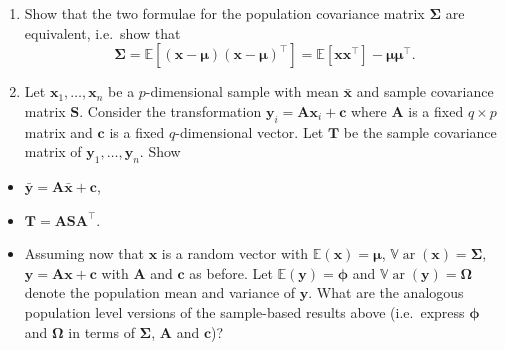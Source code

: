 \documentclass[
]{book}
\theoremstyle{definition}
\theoremstyle{definition}
\theoremstyle{definition}
\theoremstyle{definition}
\theoremstyle{remark}
\begin{document}
\begin{enumerate}
\def\labelenumi{\arabic{enumi}.}
\item
  Show that the two formulae for the population covariance matrix \(\boldsymbol{\Sigma}\) are equivalent, i.e.~show that
  \[\boldsymbol{\Sigma}= {\mathbb{E}}[(\mathbf x- {\boldsymbol{\mu}}) (\mathbf x- {\boldsymbol{\mu}})^\top ] = {\mathbb{E}}[ \mathbf x\mathbf x^\top ] - {\boldsymbol{\mu}}{\boldsymbol{\mu}}^\top.\]
\item
  Let \(\mathbf x_1, \ldots, \mathbf x_n\) be a \(p\)-dimensional sample with mean \(\bar{\mathbf x}\) and sample covariance matrix \(\mathbf S\). Consider the transformation \(\mathbf y_i = \mathbf A\mathbf x_i + \mathbf c\) where \(\mathbf A\) is a fixed \(q \times p\) matrix and \(\mathbf c\) is a fixed \(q\)-dimensional vector. Let \(\mathbf T\) be the sample covariance matrix of \(\mathbf y_1, \ldots, \mathbf y_n\). Show
\end{enumerate}

\begin{itemize}
\item
  \(\bar{\mathbf y} = \mathbf A\bar{\mathbf x} + \mathbf c\),
\item
  \(\mathbf T= \mathbf A\mathbf S\mathbf A^\top\).
\item
  Assuming now that \(\mathbf x\) is a random vector with \({\mathbb{E}}(\mathbf x)={\boldsymbol{\mu}}\), \({\mathbb{V}\operatorname{ar}}(\mathbf x)=\boldsymbol{\Sigma}\), \(\mathbf y=\mathbf A\mathbf x+\mathbf c\) with \(\mathbf A\) and \(\mathbf c\) as before. Let \({\mathbb{E}}(\mathbf y)={\pmb \phi}\) and \({\mathbb{V}\operatorname{ar}}(\mathbf y)={\pmb \Omega}\) denote the population mean and variance of \(\mathbf y\). What are the analogous population level versions of the sample-based results above (i.e.~express \({\pmb \phi}\) and \({\pmb \Omega}\) in terms of \(\boldsymbol{\Sigma}\), \(\mathbf A\) and \(\mathbf c\))?
\end{itemize}
\end{document}
